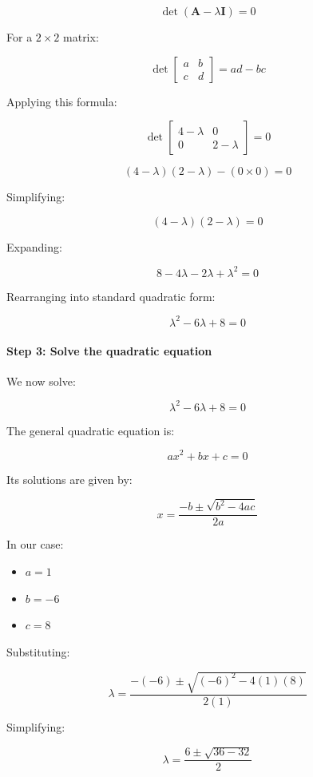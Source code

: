 \documentclass[11pt]{article}
\providecommand{\tightlist}{%
      \setlength{\itemsep}{0pt}\setlength{\parskip}{0pt}}
\begin{document}
\[
\det(\mathbf{A} - \lambda \mathbf{I}) = 0
\]

For a \(2 \times 2\) matrix:

\[
\det
\begin{bmatrix}
a & b \\
c & d
\end{bmatrix}
= ad - bc
\]

Applying this formula:

\[
\det
\begin{bmatrix}
4-\lambda & 0 \\
0 & 2-\lambda
\end{bmatrix}
= 0
\]

\[
(4-\lambda)(2-\lambda) - (0 \times 0) = 0
\]

Simplifying:

\[
(4-\lambda)(2-\lambda) = 0
\]

Expanding:

\[
8 - 4\lambda - 2\lambda + \lambda^2 = 0
\]

Rearranging into standard quadratic form:

\[
\boxed{\lambda^2 - 6\lambda + 8 = 0}
\]

\paragraph{Step 3: Solve the quadratic
equation}\label{step-3-solve-the-quadratic-equation}

We now solve:

\[
\lambda^2 - 6\lambda + 8 = 0
\]

The general quadratic equation is:

\[
ax^2 + bx + c = 0
\]

Its solutions are given by:

\[
x = \frac{-b \pm \sqrt{b^2 - 4ac}}{2a}
\]

In our case:

\begin{itemize}
\tightlist
\item
  \(a = 1\)
\item
  \(b = -6\)
\item
  \(c = 8\)
\end{itemize}

Substituting:

\[
\lambda =
\frac{-(-6) \pm \sqrt{(-6)^2 - 4(1)(8)}}{2(1)}
\]

Simplifying:

\[
\lambda =
\frac{6 \pm \sqrt{36-32}}{2}
\]
\end{document}
